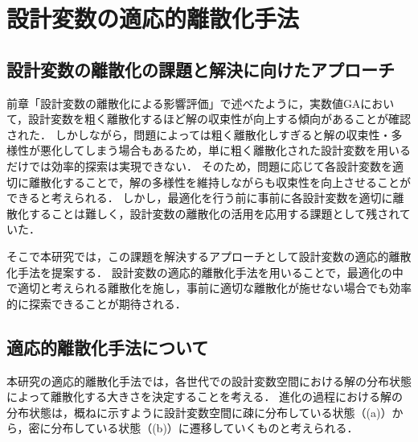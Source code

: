 \documentclass[../main/main]{subfiles}
\begin{document}
\chapter{設計変数の適応的離散化手法}
\section{設計変数の離散化の課題と解決に向けたアプローチ}
\quad 前章「設計変数の離散化による影響評価」で述べたように，実数値GAにおいて，設計変数を粗く離散化するほど解の収束性が向上する傾向があることが確認された．
しかしながら，問題によっては粗く離散化しすぎると解の収束性・多様性が悪化してしまう場合もあるため，単に粗く離散化された設計変数を用いるだけでは効率的探索は実現できない．
そのため，問題に応じて各設計変数を適切に離散化することで，解の多様性を維持しながらも収束性を向上させることができると考えられる．
しかし，最適化を行う前に事前に各設計変数を適切に離散化することは難しく，設計変数の離散化の活用を応用する課題として残されていた．

そこで本研究では，この課題を解決するアプローチとして設計変数の適応的離散化手法を提案する．
設計変数の適応的離散化手法を用いることで，最適化の中で適切と考えられる離散化を施し，事前に適切な離散化が施せない場合でも効率的に探索できることが期待される．

\section{適応的離散化手法について}
\quad 本研究の適応的離散化手法では，各世代での設計変数空間における解の分布状態によって離散化する大きさを決定することを考える．
進化の過程における解の分布状態は，概ねに示すように設計変数空間に疎に分布している状態（(a)）から，密に分布している状態（(b)）に遷移していくものと考えられる．
\end{document}
